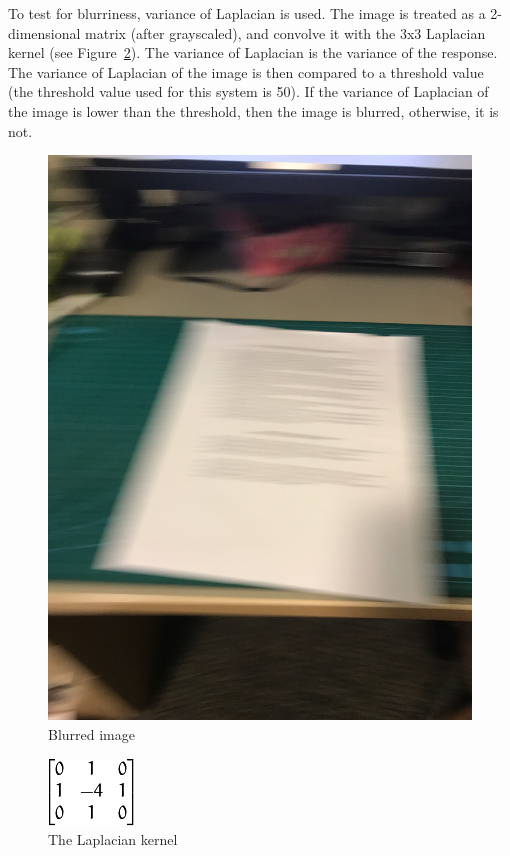 To test for blurriness, variance of Laplacian \cite{PechPacheco} is used. The image is treated as a 2-dimensional matrix (after grayscaled), and convolve it with the 3x3 Laplacian kernel (see Figure~\ref{laplacianKernel}). The variance of Laplacian is the variance of the response. The variance of Laplacian of the image is then compared to a threshold value (the threshold value used for this system is 50). If the variance of Laplacian of the image is lower than the threshold, then the image is blurred, otherwise, it is not.
\begin{figure}
	\centering
    \includegraphics[scale = 0.075]{blur.jpg}
    
    \caption{Blurred image}
	\label{blurredImage}
\end{figure}

\begin{figure}
	\centering
    \includegraphics[scale = 0.5]{laplacian_kernel.png}
    
    \caption{The Laplacian kernel}
	\label{laplacianKernel}
\end{figure}

